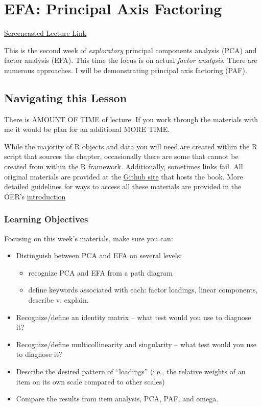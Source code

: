 \documentclass[
  english,
]{book}
\providecommand{\tightlist}{%
  \setlength{\itemsep}{0pt}\setlength{\parskip}{0pt}}
\begin{document}
\hypertarget{PAF}{%
\chapter{EFA: Principal Axis Factoring}\label{PAF}}

\href{link}{Screencasted Lecture Link}

This is the second week of \emph{exploratory} principal components analysis (PCA) and factor analysis (EFA). This time the focus is on actual \emph{factor analysis}. There are numerous approaches. I will be demonstrating principal axis factoring (PAF).

\hypertarget{navigating-this-lesson-7}{%
\section{Navigating this Lesson}\label{navigating-this-lesson-7}}

There is AMOUNT OF TIME of lecture. If you work through the materials with me it would be plan for an additional MORE TIME.

While the majority of R objects and data you will need are created within the R script that sources the chapter, occasionally there are some that cannot be created from within the R framework. Additionally, sometimes links fail. All original materials are provided at the \href{https://github.com/lhbikos/ReC_Psychometrics}{Github site} that hosts the book. More detailed guidelines for ways to access all these materials are provided in the OER's \protect\hyperlink{ReCintro}{introduction}

\hypertarget{learning-objectives-7}{%
\subsection{Learning Objectives}\label{learning-objectives-7}}

Focusing on this week's materials, make sure you can:

\begin{itemize}
\tightlist
\item
  Distinguish between PCA and EFA on several levels:

  \begin{itemize}
  \tightlist
  \item
    recognize PCA and EFA from a path diagram
  \item
    define keywords associated with each: factor loadings, linear components, describe v. explain.\\
  \end{itemize}
\item
  Recognize/define an identity matrix -- what test would you use to diagnose it?
\item
  Recognize/define multicollinearity and singularity -- what test would you use to diagnose it?
\item
  Describe the desired pattern of ``loadings'' (i.e., the relative weights of an item on its own scale compared to other scales)
\item
  Compare the results from item analysis, PCA, PAF, and omega.
\end{itemize}
\end{document}
